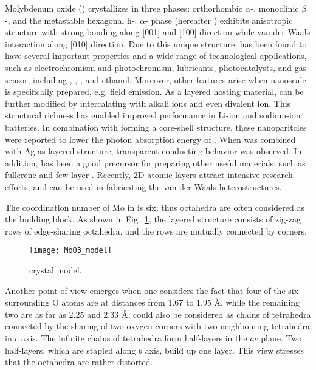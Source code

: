 Molybdenum oxide () crystallizes in three phases: orthorhombic $\alpha$-, monoclinic $\beta$-, and the metastable hexagonal h-.\citep{Deb1968,Fibers2007} $\alpha$- phase (hereafter ) exhibits anisotropic structure with strong bonding along [001] and [100] direction while van der Waals interaction along [010] direction.\cite{He2003} Due to this unique structure,  has been found to have several important properties and a wide range of technological applications, such as electrochromism and photochromism,\cite{Yao1992} lubricants,\cite{Sheehan1996} photocatalysts,\cite{Chen2010} and gas sensor, including ,\cite{Comini2005} ,\cite{Taurino2006} ,\cite{Sha2009} and ethanol.\cite{Choopun} Moreover, other features arise when nanoscale  is specifically prepared, e.g. field emission.\citep{Li2002d,Zhou2003b}  As a layered hosting material,  can be further modified by intercalating with alkali ions\citep{Spahr1995,Li2006b,Hu2011} and even divalent ion.\cite{Sian2005} This structural richness has enabled improved performance in Li-ion\cite{Mai2007} and sodium-ion batteries.\cite{Hariharan2013} In combination with  forming a core-shell structure, these nanoparitcles were reported to lower the photon absorption energy of .\cite{Elder2000} When  was combined with Ag as layered structure, transparent conducting behavior was observed.\cite{Nguyen2012} In addition,  has been a good precursor for preparing other useful materials, such as  fullerene\cite{Li2003c} and few layer .\cite{Lin2012} Recently, 2D atomic layers attract intensive research efforts, and  can be used in fabricating the van der Waals heterostructures.\cite{Geim2013}

The coordination number of Mo in  is six; thus  octahedra are often considered as the building block. As shown in Fig.~\ref{fig:mo3model}, the layered structure consists of zig-zag rows of edge-sharing  octahedra, and the rows are mutually connected by corners.
\begin{figure}[htb]
\centering
\texttt{[image: MoO3\_model]}
\caption[ crystal model]{ crystal model.}
\label{fig:mo3model}
\end{figure}
Another point of view emerges when one considers the fact that four of the six surrounding O atoms are at distances from 1.67 to 1.95 \AA, while the remaining two are as far as 2.25 and 2.33 \AA,  could also be considered as chains of  tetrahedra connected by the sharing of two oxygen corners with two neighbouring tetrahedra in $c$ axis. The infinite chains of  tetrahedra form half-layers in the $ac$ plane. Two half-layers, which are stapled along $b$ axis, build up one  layer.\cite{Itoh2001a} This view stresses that the  octahedra are rather distorted.

